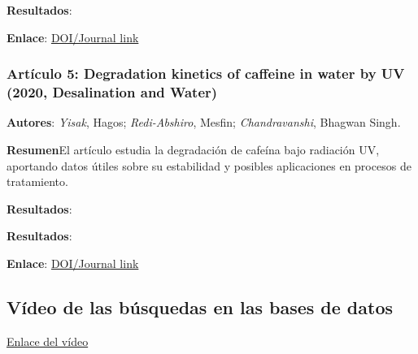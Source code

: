 \documentclass{article}
\begin{document}
\textbf{Resultados}: \vspace{0.5cm}


\textbf{Enlace}: \href{https://doi.org/xxxxxx}{DOI/Journal link} \vspace{0.5cm}

\subsubsection{\textbf{Artículo 5:} \textcolor{blue-violet}{\textbf{Degradation kinetics of caffeine in water by UV (2020, Desalination and Water)}}} \vspace{0.5cm}

\textbf{Autores}: \textit{Yisak}, Hagos; \textit{Redi-Abshiro}, Mesfin; \textit{Chandravanshi}, Bhagwan Singh. \vspace{0.5cm}


\textbf{Resumen}El artículo estudia la degradación de cafeína bajo radiación UV, aportando datos útiles sobre su estabilidad y posibles aplicaciones en procesos de tratamiento. \vspace{0.5cm}

\textbf{Resultados}: \vspace{0.5cm}

\textbf{Resultados}: \vspace{0.5cm}

\textbf{Enlace}: \href{https://doi.org/xxxxxx}{DOI/Journal link} \vspace{0.5cm}

\subsection{Vídeo de las búsquedas en las bases de datos}\vspace{0.5cm}

\href{Enlace del vídeo}{Enlace del vídeo}
\end{document}
